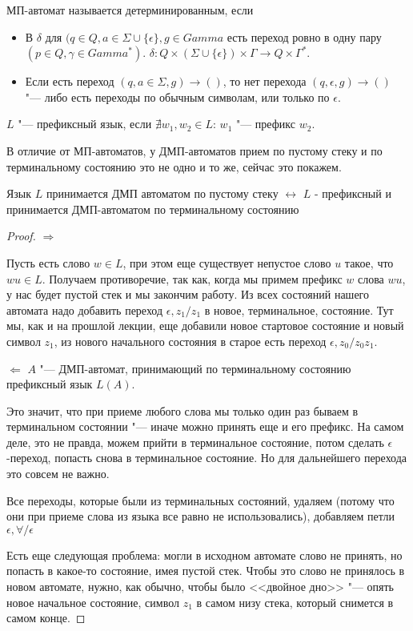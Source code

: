 \begin{Def}
МП-автомат называется детерминированным, если 
\begin{itemize}
    \item
        В $\delta$ для $(q \in Q, a \in \Sigma \cup \{\epsilon\}, g \in Gamma$ есть переход ровно в одну пару $(p \in Q, \gamma \in Gamma^*)$.
        $\delta\colon Q \times (\Sigma \cup \{\epsilon\}) \times \Gamma \to Q \times \Gamma^*$.
    \item
        Если есть переход $(q, a \in \Sigma, g) \to ()$, то нет перехода $(q, \epsilon, g) \to ()$ "--- либо есть переходы по обычным символам, или только по $\epsilon$.
\end{itemize}
\end{Def}

\begin{Def}
    $L$ "--- префиксный язык, если $\nexists w_1, w_2 \in L$: $w_1$ "--- префикс $w_2$.
\end{Def}

В отличие от МП-автоматов, у ДМП-автоматов прием по пустому стеку и по терминальному состоянию это не одно и то же, сейчас это покажем.

\begin{theorem}
Язык $L$ принимается ДМП автоматом по пустому стеку $\leftrightarrow$ $L$ - префиксный и принимается ДМП-автоматом по терминальному состоянию
\end{theorem}
\begin{proof}
$\Rightarrow$

Пусть есть слово $w \in L$, при этом еще существует непустое слово $u$ такое, что $wu \in L$.
Получаем противоречие, так как, когда мы примем префикс $w$ слова $wu$, у нас будет пустой стек и мы закончим работу.
Из всех состояний нашего автомата надо добавить переход $\epsilon, z_1/z_1$ в новое, терминальное, состояние. 
Тут мы, как и на прошлой лекции, еще добавили новое стартовое состояние и новый символ $z_1$, из нового начального состояния в старое есть переход $\epsilon, z_0/z_0z_1$.

$\Leftarrow$
$A$ "--- ДМП-автомат, принимающий по терминальному состоянию префиксный язык $L(A)$.

Это значит, что при приеме любого слова мы только один раз бываем в терминальном состоянии "--- иначе можно принять еще и его префикс.
На самом деле, это не правда, можем прийти в терминальное состояние, потом сделать $\epsilon$-переход, попасть снова в терминальное состояние. 
Но для дальнейшего перехода это совсем не важно.

Все переходы, которые были из терминальных состояний, удаляем (потому что они при приеме слова из языка все равно не использовались), добавляем петли $\epsilon, \forall/\epsilon$

Есть еще следующая проблема: могли в исходном автомате слово не принять, но попасть в какое-то состояние, имея пустой стек. 
Чтобы это слово не принялось в новом автомате, нужно, как обычно, чтобы было <<двойное дно>> "--- опять новое начальное состояние, символ $z_1$ в самом низу стека, который снимется в самом конце.
\end{proof}

